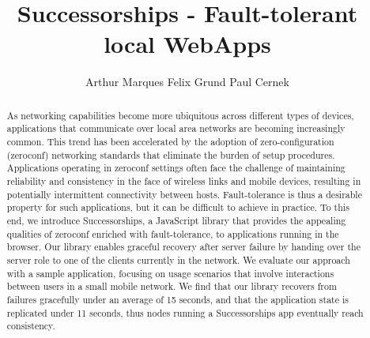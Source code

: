 \documentclass[sigconf]{acmart}
\title{Successorships - Fault-tolerant local WebApps}
\author{Arthur Marques \qquad Felix Grund \qquad Paul Cernek}
\affiliation{
    \institution{University of British Columbia}
    \city{Vancouver} 
    \state{BC} 
  }
\begin{document}
\begin{abstract}
As networking capabilities become more ubiquitous across different types of devices, applications that communicate over local area networks are becoming increasingly common.
This trend has been accelerated by the adoption of zero-configuration (zeroconf) networking standards that eliminate the burden of setup procedures.
Applications operating in zeroconf settings often face the challenge of maintaining reliability and consistency in the face of wireless links and mobile devices, resulting in potentially intermittent connectivity between hosts.
Fault-tolerance is thus a desirable property for such applications, but it can be difficult to achieve in practice.
To this end, we introduce Successorships, a JavaScript library that provides the appealing qualities of zeroconf enriched with fault-tolerance, to applications running in the browser.
Our library enables graceful recovery after server failure by handing over the server role to one of the clients currently in the network.
We evaluate our approach with a sample application, focusing on usage scenarios that involve interactions between users in a small mobile network. 
We find that our library recovers from failures gracefully under an average of 15 seconds, and that the application state is replicated under 11 seconds, thus nodes running a Successorships app eventually reach consistency.
\end{abstract}

\maketitle





%













\end{document}
